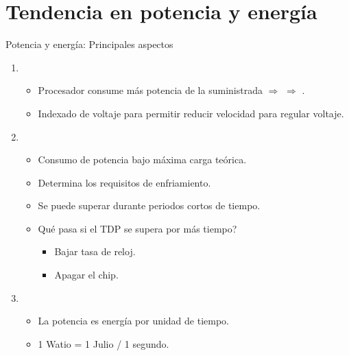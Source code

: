 \section{Tendencia en potencia y energía}

\begin{frame}[t]{Potencia y energía: Principales aspectos}
\begin{enumerate}
  \item {}
    \begin{itemize}
      \item Procesador consume más potencia de la suministrada $\Rightarrow$ 
            $\Rightarrow$ .
      \item Indexado de voltaje para permitir reducir velocidad para regular voltaje.
    \end{itemize}

  \item {}
    \begin{itemize}
      \item Consumo de potencia bajo máxima carga teórica.
      \item Determina los requisitos de enfriamiento.
      \item Se puede superar durante periodos cortos de tiempo.
      \item Qué pasa si el TDP se supera por más tiempo?
        \begin{itemize}
          \item Bajar tasa de reloj.
          \item Apagar el chip.
        \end{itemize}
    \end{itemize}   

  \item {}
    \begin{itemize}
      \item La potencia es energía por unidad de tiempo.
      \item 1 Watio = 1 Julio / 1 segundo.
    \end{itemize}
\end{enumerate}
\end{frame}


